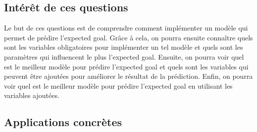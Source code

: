 \documentclass[12pt]{article}
\begin{document}
\subsection{Intérêt de ces questions}
\noindent Le but de ces questions est de comprendre comment implémenter un modèle qui permet de prédire l'expected goal. Grâce à cela, on pourra ensuite connaître quels sont les variables obligatoires pour implémenter un tel modèle et quels sont les paramètres qui influencent le plus l'expected goal. Ensuite, on pourra voir quel est le meilleur modèle pour prédire l'expected goal et quels sont les variables qui peuvent être ajoutées pour améliorer le résultat de la prédiction. Enfin, on pourra voir quel est le meilleur modèle pour prédire l'expected goal en utilisant les variables ajoutées.
\subsection{Applications concrètes}



\end{document}
